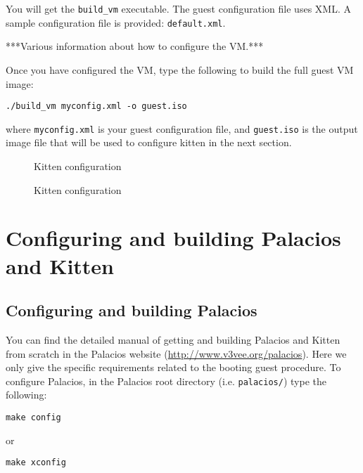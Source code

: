 \documentclass{article}[11pt]
\def\colfigsize{\epsfxsize=5in}
\begin{document}
\vspace{10pt}
\noindent
You will get the \verb|build_vm| executable. The guest configuration file uses
XML. A sample configuration file is provided: \verb|default.xml|.

\vspace{5pt}
\noindent
***Various information about how to configure the VM.***

\vspace{5pt}
\noindent
Once you have configured the VM, type the following to build the full guest VM
image:
\begin{verbatim}
./build_vm myconfig.xml -o guest.iso
\end{verbatim}
where \verb+myconfig.xml+ is your guest configuration file, and \verb+guest.iso+
is the output image file that will be used to configure kitten in the next
section.




\pagebreak
\begin{figure}[h]
  \begin{center}
    \colfigsize{}
  \end{center}
  \caption{Kitten configuration}
  \label{fig:kittencf}
\end{figure}

\begin{figure}[h]
  \begin{center}
    \colfigsize{}
  \end{center}
  \caption{Kitten configuration}
  \label{fig:kittencf2}
\end{figure}


\section{Configuring and building Palacios and Kitten}
\subsection*{Configuring and building Palacios}

You can find the detailed manual of getting and building Palacios and Kitten 
from scratch in the Palacios website (\url{http://www.v3vee.org/palacios}). Here
we only give the specific requirements related to the booting guest procedure.
To configure Palacios, in the Palacios root directory (i.e. \verb+palacios/+)
type the following:

\begin{verbatim}
make config
\end{verbatim}
or
\begin{verbatim}
make xconfig
\end{verbatim}
\end{document}
